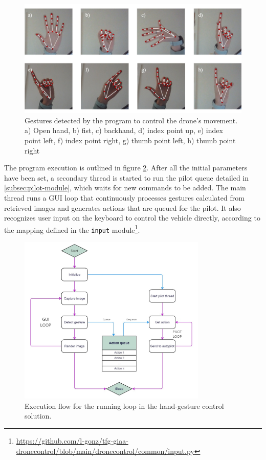 \begin{figure}
  \centering
  \includegraphics[width=\textwidth, keepaspectratio]{img/hand-gestures.jpg}
  \caption{Gestures detected by the program to control the drone's movement. a) Open hand, b) fist, c) backhand, d) index point up, e) index point left, f) index point right, g) thumb point left, h) thumb point right}
  \label{fig:hand-gestures}
\end{figure}


The program execution is outlined in figure \ref{fig:hands-loop}.
After all the initial parameters have been set, a secondary thread is started to run the pilot queue detailed in \ref{subsec:pilot-module}, which waits for new commands to be added.
The main thread runs a GUI loop that continuously processes gestures calculated from retrieved images and generates actions that are queued for the pilot.
It also recognizes user input on the keyboard to control the vehicle directly, according to the mapping defined in the \texttt{input} module\footnote{\url{https://github.com/l-gonz/tfg-giaa-dronecontrol/blob/main/dronecontrol/common/input.py}}.

\begin{figure}
  \centering
  \includegraphics[width=0.8\textwidth, keepaspectratio]{img/hand-loop.jpg}
  \caption{Execution flow for the running loop in the hand-gesture control solution.}
  \label{fig:hands-loop}
\end{figure}

